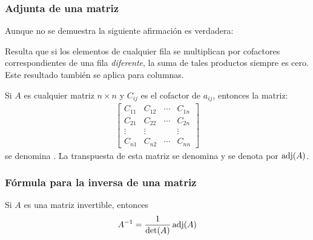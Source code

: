 \documentclass[a4paper,12pt]{article}
\begin{document}
\subsubsection{Adjunta de una matriz}

Aunque no se demuestra la siguiente afirmación es verdadera:
\begin{concept}
  Resulta que si los elementos de cualquier fila se multiplican por cofactores
  correspondientes de una fila \emph{diferente}, la suma de tales productos
  siempre es cero. Este resultado también se aplica para columnas.
\end{concept}

\begin{concept}
  Si $A$ es cualquier matriz $n\times n$ y $C_{ij}$ es el cofactor de
  $a_{ij}$, entonces la matriz:
  \begin{align*}
    \begin{bmatrix}
      C_{11}& C_{12}& \cdots& C_{1n}\\
      C_{21}& C_{22}& \cdots& C_{2n}\\
      \vdots&\vdots &       &\vdots \\
      C_{n1}& C_{n2}& \cdots& C_{nn}
    \end{bmatrix}
  \end{align*}
  se denomina . La transpuesta de esta matriz
  se denomina  y se denota por $\operatorname*{adj}(A)$.
\end{concept}

\subsubsection{Fórmula para la inversa de una matriz}

\begin{theorem}
  Si $A$ es una matriz invertible, entonces
  \begin{align*}
    A^{-1}=\frac{1}{\det(A)}\operatorname*{adj}(A)
  \end{align*}
  \label{theo:inv_adjunta}
\end{theorem}
\end{document}

